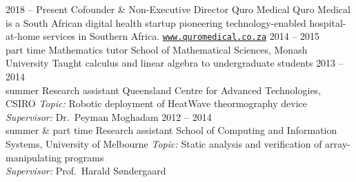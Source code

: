 \documentclass[9pt]{developercv} %
\begin{document}
\begin{entrylist}
    \entry
        {2018 -- Present}%
        {Cofounder \& Non-Executive Director}
        {Quro Medical}
        {Quro Medical is a South African digital health startup pioneering technology-enabled hospital-at-home services in Southern Africa. \texttt{\href{https://www.quromedical.co.za}{www.quromedical.co.za}}}
    \entry
        {2014 -- 2015\\\footnotesize{part time}}
        {Mathematics tutor}
        {School of Mathematical Sciences, Monash University}
        {Taught calculus and linear algebra to undergraduate students}
    \entry
        {2013 -- 2014\\\footnotesize{summer}}
        {Research assistant}
        {Queensland Centre for Advanced Technologies, CSIRO}
        {\textit{Topic:} Robotic deployment of HeatWave theormography device\\
        \textit{Supervisor:} Dr.\ Peyman Moghadam}
    \entry
        {2012 -- 2014\\\footnotesize{summer \& part time}}
        {Research assistant}
        {School of Computing and Information Systems, University of Melbourne}
        {\textit{Topic:} Static analysis and verification of array-manipulating programs\\
        \textit{Supervisor:} Prof.\ Harald S\o ndergaard}
\end{entrylist}
\end{document}
